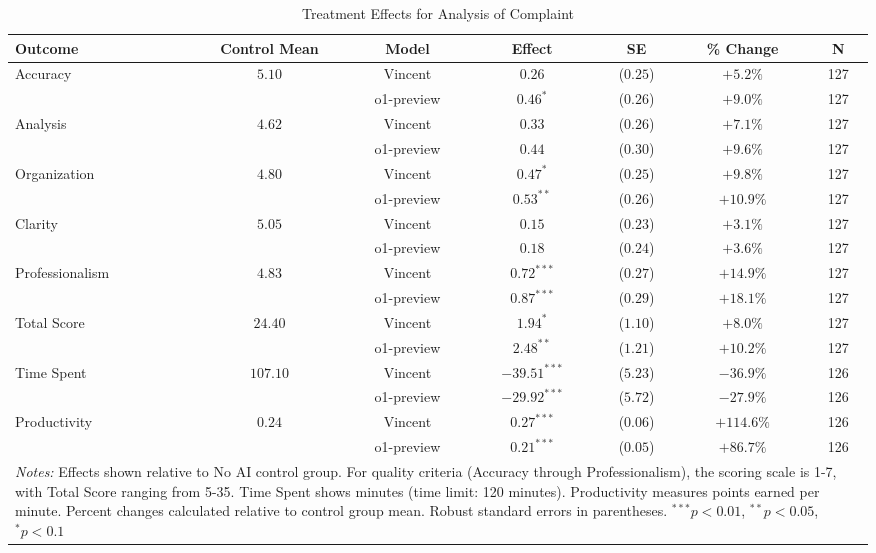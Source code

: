 \begin{table}[!htbp]
\centering
\caption{Treatment Effects for Analysis of Complaint}
\label{tab:task3_effects}
\begin{tabular}{lcccccc}
\hline\hline
Outcome & Control Mean & Model & Effect & SE & \% Change & N \\
\hline
\multirow{2}{*}{Accuracy} & \multirow{2}{*}{$5.10$} & Vincent & $0.26$ & ($0.25$) & $+5.2\%$ & 127 \\
& & o1-preview & $0.46^{*}$ & ($0.26$) & $+9.0\%$ & 127 \\
\hline
\multirow{2}{*}{Analysis} & \multirow{2}{*}{$4.62$} & Vincent & $0.33$ & ($0.26$) & $+7.1\%$ & 127 \\
& & o1-preview & $0.44$ & ($0.30$) & $+9.6\%$ & 127 \\
\hline
\multirow{2}{*}{Organization} & \multirow{2}{*}{$4.80$} & Vincent & $0.47^{*}$ & ($0.25$) & $+9.8\%$ & 127 \\
& & o1-preview & $0.53^{**}$ & ($0.26$) & $+10.9\%$ & 127 \\
\hline
\multirow{2}{*}{Clarity} & \multirow{2}{*}{$5.05$} & Vincent & $0.15$ & ($0.23$) & $+3.1\%$ & 127 \\
& & o1-preview & $0.18$ & ($0.24$) & $+3.6\%$ & 127 \\
\hline
\multirow{2}{*}{Professionalism} & \multirow{2}{*}{$4.83$} & Vincent & $0.72^{***}$ & ($0.27$) & $+14.9\%$ & 127 \\
& & o1-preview & $0.87^{***}$ & ($0.29$) & $+18.1\%$ & 127 \\
\hline
\multirow{2}{*}{Total Score} & \multirow{2}{*}{$24.40$} & Vincent & $1.94^{*}$ & ($1.10$) & $+8.0\%$ & 127 \\
& & o1-preview & $2.48^{**}$ & ($1.21$) & $+10.2\%$ & 127 \\
\hline
\multirow{2}{*}{Time Spent} & \multirow{2}{*}{$107.10$} & Vincent & $-39.51^{***}$ & ($5.23$) & $-36.9\%$ & 126 \\
& & o1-preview & $-29.92^{***}$ & ($5.72$) & $-27.9\%$ & 126 \\
\hline
\multirow{2}{*}{Productivity} & \multirow{2}{*}{$0.24$} & Vincent & $0.27^{***}$ & ($0.06$) & $+114.6\%$ & 126 \\
& & o1-preview & $0.21^{***}$ & ($0.05$) & $+86.7\%$ & 126 \\
\hline
\multicolumn{7}{p{0.95\linewidth}}{\footnotesize \textit{Notes:} Effects shown relative to No AI control group. For quality criteria (Accuracy through Professionalism), the scoring scale is 1-7, with Total Score ranging from 5-35. Time Spent shows minutes (time limit: 120 minutes). Productivity measures points earned per minute. Percent changes calculated relative to control group mean. Robust standard errors in parentheses. $^{***}p<0.01$, $^{**}p<0.05$, $^{*}p<0.1$}
\end{tabular}
\end{table}